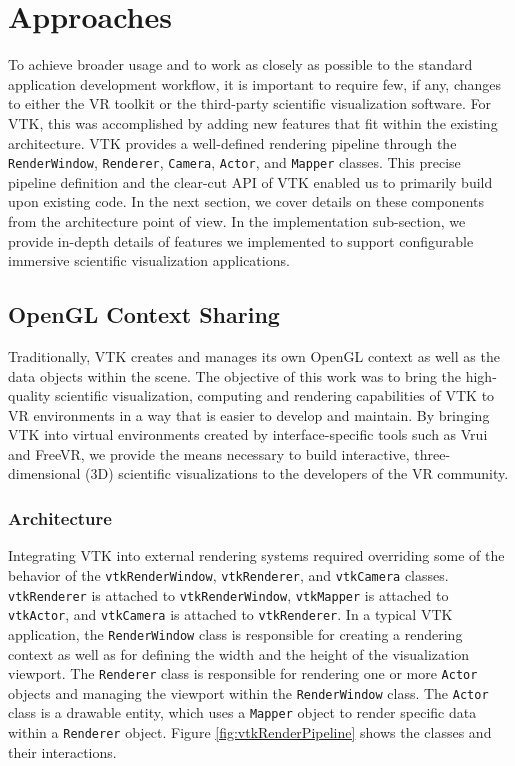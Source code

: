 \section{Approaches}

To achieve broader usage and to work as closely as possible to the standard application development workflow, it is important to require few, if any, changes to either the VR toolkit or the third-party scientific visualization software.
For VTK, this was accomplished by adding new features that fit within the existing architecture. 
VTK provides a well-defined rendering pipeline through the \texttt{RenderWindow}, \texttt{Renderer}, \texttt{Camera}, \texttt{Actor}, and \texttt{Mapper} classes.
This precise pipeline definition and the clear-cut API of VTK enabled us to primarily build upon
existing code.
In the next section, we cover details on these components from the architecture point of view.
In the implementation sub-section, we provide in-depth details of features we implemented to support configurable immersive scientific visualization applications. 

\subsection{OpenGL Context Sharing}

Traditionally, VTK creates and manages its own OpenGL context as well as the data objects within the scene.
The objective of this work was to bring the high-quality scientific visualization, computing and rendering capabilities of VTK to VR environments in a way that is easier to develop and maintain.
By bringing VTK into virtual environments created by interface-specific tools such as Vrui and FreeVR, we provide the means necessary to build interactive, three-dimensional (3D) scientific visualizations to the developers of the VR community.

\subsubsection{Architecture}

Integrating VTK into external rendering systems required overriding some of the behavior of the \texttt{vtkRenderWindow}, \texttt{vtkRenderer}, and \texttt{vtkCamera} classes.
\texttt{vtkRenderer} is attached to \texttt{vtkRenderWindow}, \texttt{vtkMapper} is attached to \texttt{vtkActor}, and \texttt{vtkCamera} is attached to \texttt{vtkRenderer}.
In a typical VTK application, the \texttt{RenderWindow} class is responsible for creating a rendering context as well as for defining the width and the height of the visualization viewport.
The \texttt{Renderer} class is responsible for rendering one or more
\texttt{Actor} objects and managing the viewport within the \texttt{RenderWindow} class.
The \texttt{Actor} class is a drawable entity, which uses a \texttt{Mapper} object to render specific data within a \texttt{Renderer} object.
Figure \ref{fig:vtkRenderPipeline} shows the classes and their interactions.

